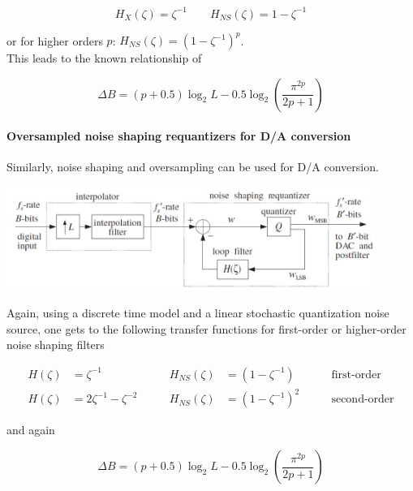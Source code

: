 \begin{equation*}
	H_X(\zeta) = \zeta^{-1} \qquad H_{NS}(\zeta) = 1 - \zeta^{-1}
\end{equation*}

or for higher orders $p$: $H_{NS}(\zeta) = (1-\zeta^{-1})^p$. \\

This leads to the known relationship of

\begin{equation*}
	\Delta B = (p+0.5) \log_2 L - 0.5 \log_2\left(\frac{\pi^{2p}}{2p+1}\right)
\end{equation*}


\paragraph{Oversampled noise shaping requantizers for D/A conversion}
Similarly, noise shaping and oversampling can be used for D/A conversion.

\begin{center}
	\includegraphics[width=12cm]{images/IntDecOv_Requantizer.jpg}
\end{center}

Again, using a discrete time model and a linear stochastic quantization
noise source, one gets to the following transfer functions for first-order 
or higher-order noise shaping filters

\begin{align*}
	H(\zeta) &= \zeta^{-1} \qquad &
	H_{NS}(\zeta) &= (1-\zeta^{-1}) \qquad
	& \text{first-order} \\
	H(\zeta) &= 2 \zeta^{-1} - \zeta^{-2} \qquad &
	H_{NS}(\zeta) &= (1-\zeta^{-1})^2 \qquad
	& \text{second-order}
\end{align*}

and again

\begin{equation*}
	\Delta B = (p+0.5) \log_2 L - 0.5 \log_2\left(\frac{\pi^{2p}}{2p+1}\right)
\end{equation*}